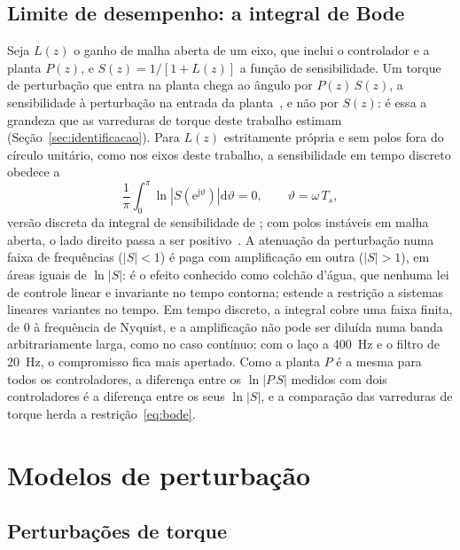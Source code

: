 \subsection{Limite de desempenho: a integral de Bode}
\label{sec:bode}

Seja $L(z)$ o ganho de malha aberta de um eixo, que inclui o controlador e a
planta $P(z)$, e $S(z) = 1/[1 + L(z)]$ a função de sensibilidade. Um torque
de perturbação que entra na planta chega ao ângulo por $P(z)\,S(z)$, a
sensibilidade à perturbação na entrada da planta~\cite{landau2011}, e não por
$S(z)$: é essa a grandeza que as varreduras de torque deste trabalho estimam
(Seção~\ref{sec:identificacao}). Para $L(z)$ estritamente própria e sem polos
fora do círculo unitário, como nos eixos deste trabalho, a sensibilidade em
tempo discreto obedece a~\cite{sung1988,mohtadi1990}
\begin{equation}
\frac{1}{\pi}\int_0^{\pi}\ln\left|S\!\left(\mathrm{e}^{\mathrm{j}\vartheta}\right)\right|
\mathrm{d}\vartheta = 0,
\qquad \vartheta = \omega\,T_s,
\label{eq:bode}
\end{equation}
versão discreta da integral de sensibilidade de
; com polos instáveis em malha aberta, o lado direito
passa a ser positivo~\cite{freudenberg1985}. A atenuação da perturbação numa
faixa de frequências ($|S| < 1$) é paga com amplificação em outra
($|S| > 1$), em áreas iguais de $\ln|S|$: é o efeito conhecido como colchão
d'água, que nenhuma lei de controle linear e invariante no tempo contorna;
 estende a restrição a sistemas lineares variantes no
tempo. Em tempo discreto, a integral cobre uma faixa finita, de 0 à
frequência de Nyquist, e a amplificação não pode ser diluída numa banda
arbitrariamente larga, como no caso contínuo; com o laço a \SI{400}{\hertz}
e o filtro de \SI{20}{\hertz}, o compromisso fica mais apertado.
Como a planta $P$ é a mesma para todos os controladores, a diferença entre os
$\ln|P\,S|$ medidos com dois controladores é a diferença entre os seus
$\ln|S|$, e a comparação das varreduras de torque herda a
restrição~\eqref{eq:bode}.

\section{Modelos de perturbação}
\label{sec:perturbacoes}

\subsection{Perturbações de torque}

